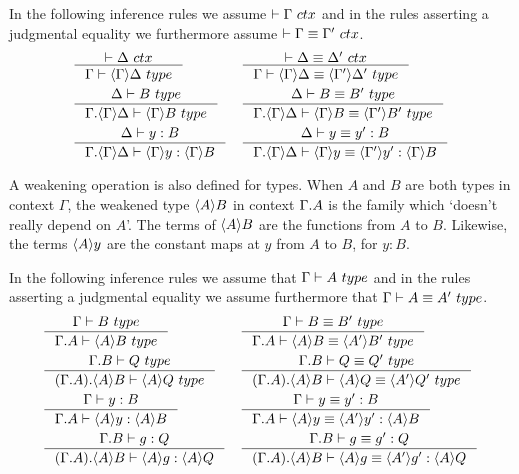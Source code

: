 In the following inference rules we assume $\jctx{\Gamma}$ and in the rules
asserting a judgmental equality we furthermore assume $\jctxeq{\Gamma}{\Gamma'}$.
\begin{align}
& \inference{\jctx{\Delta}}{\jtype{\Gamma}{\ctxwk{\Gamma}{\Delta}}} 
& & \inference{\jctxeq{\Delta}{\Delta'}}{\jtypeeq{\Gamma}{\ctxwk{\Gamma}{\Delta}}{\ctxwk{\Gamma'}{\Delta'}}}\\
& \inference{\jtype{\Delta}{B}}{\jtype{\ctxext{\Gamma}{\ctxwk{\Gamma}{\Delta}}}{\ctxwk{\Gamma}{B}}}
& & \inference{\jtypeeq{\Delta}{B}{B'}}{\jtypeeq{\ctxext{\Gamma}{\ctxwk{\Gamma}{\Delta}}}{\ctxwk{\Gamma}{B}}{\ctxwk{\Gamma'}{B'}}}\\
& \inference{\jterm{\Delta}{B}{y}}{\jterm{\ctxext{\Gamma}{\ctxwk{\Gamma}{\Delta}}}{\ctxwk{\Gamma}{B}}{\ctxwk{\Gamma}{y}}} 
& & \inference{\jtermeq{\Delta}{B}{y}{y'}}{\jtermeq{\ctxext{\Gamma}{\ctxwk{\Gamma}{\Delta}}}{\ctxwk{\Gamma}{B}}{\ctxwk{\Gamma}{y}}{\ctxwk{\Gamma'}{y'}}} 
\end{align}

A weakening operation is also defined for types. When $A$ and $B$ are both types
 in context $\Gamma$, the weakened type $\ctxwk{A}{B}$ in context $\ctxext{\Gamma}{A}$
 is the family which `doesn't really depend on $A$'. The terms of $\ctxwk{A}{B}$
 are the functions from $A$ to $B$. Likewise, the terms $\ctxwk{A}{y}$ are the
 constant maps at $y$ from $A$ to $B$, for $y:B$.
 
 In the following inference rules we assume that $\jtype{\Gamma}{A}$ and in the
 rules asserting a judgmental equality we assume furthermore that 
 $\jtypeeq{\Gamma}{A}{A'}$.
\begin{align}
& \inference{\jtype{\Gamma}{B}}{\jtype{\ctxext{\Gamma}{A}}{\ctxwk{A}{B}}}
& & \inference{\jtypeeq{\Gamma}{B}{B'}}{\jtypeeq{\ctxext{\Gamma}{A}}{\ctxwk{A}{B}}{\ctxwk{A'}{B'}}}\\
& \inference{\jtype{\ctxext{\Gamma}{B}}{Q}}
{\jtype{\ctxext{{\Gamma}{A}}{\ctxwk{A}{B}}}{\ctxwk{A}{Q}}}
& & \inference{\jtypeeq{\ctxext{\Gamma}{B}}{Q}{Q'}}
{\jtypeeq{\ctxext{{\Gamma}{A}}{\ctxwk{A}{B}}}{\ctxwk{A}{Q}}{\ctxwk{A'}{Q'}}}\\
& \inference{\jterm{\Gamma}{B}{y}}{\jterm{\ctxext{\Gamma}{A}}{\ctxwk{A}{B}}{\ctxwk{A}{y}}}
& & \inference{\jtermeq{\Gamma}{B}{y}{y'}}{\jtermeq{\ctxext{\Gamma}{A}}{\ctxwk{A}{B}}{\ctxwk{A}{y}}{\ctxwk{A'}{y'}}}\\
& \inference{\jterm{\ctxext{\Gamma}{B}}{Q}{g}}{\jterm{\ctxext{{\Gamma}{A}}{\ctxwk{A}{B}}}{\ctxwk{A}{Q}}{\ctxwk{A}{g}}}
& & \inference{\jtermeq{\ctxext{\Gamma}{B}}{Q}{g}{g'}}
{\jtermeq{\ctxext{{\Gamma}{A}}{\ctxwk{A}{B}}}{\ctxwk{A}{Q}}{\ctxwk{A}{g}}{\ctxwk{A'}{g'}}}
\end{align}

